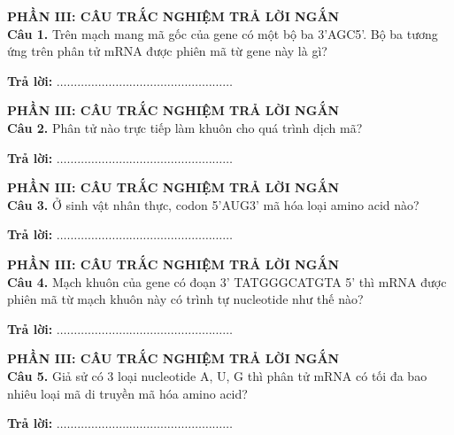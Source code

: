 \documentclass{article}
\begin{document}
\begin{minipage}[t][14.4cm][t]{\linewidth}
\fontsize{28}{38}\selectfont
{\color{brandGreen}\textbf{PHẦN III: CÂU TRẮC NGHIỆM TRẢ LỜI NGẮN}\\[10pt]}
\textbf{Câu 1.} Trên mạch mang mã gốc của gene có một bộ ba 3'AGC5'. Bộ ba tương ứng trên phân tử mRNA được phiên mã từ gene này là gì?
\vspace{20pt}

\textbf{Trả lời:} $\dots\dots\dots\dots\dots\dots\dots\dots\dots\dots\dots\dots\dots\dots\dots\dots\dots$
\vfill
\end{minipage}
\newpage


\begin{minipage}[t][14.4cm][t]{\linewidth}
\fontsize{28}{38}\selectfont
{\color{brandGreen}\textbf{PHẦN III: CÂU TRẮC NGHIỆM TRẢ LỜI NGẮN}\\[10pt]}
\textbf{Câu 2.} Phân tử nào trực tiếp làm khuôn cho quá trình dịch mã?
\vspace{20pt}

\textbf{Trả lời:} $\dots\dots\dots\dots\dots\dots\dots\dots\dots\dots\dots\dots\dots\dots\dots\dots\dots$
\vfill
\end{minipage}
\newpage


\begin{minipage}[t][14.4cm][t]{\linewidth}
\fontsize{28}{38}\selectfont
{\color{brandGreen}\textbf{PHẦN III: CÂU TRẮC NGHIỆM TRẢ LỜI NGẮN}\\[10pt]}
\textbf{Câu 3.} Ở sinh vật nhân thực, codon 5'AUG3' mã hóa loại amino acid nào?
\vspace{20pt}

\textbf{Trả lời:} $\dots\dots\dots\dots\dots\dots\dots\dots\dots\dots\dots\dots\dots\dots\dots\dots\dots$
\vfill
\end{minipage}
\newpage


\begin{minipage}[t][14.4cm][t]{\linewidth}
\fontsize{28}{38}\selectfont
{\color{brandGreen}\textbf{PHẦN III: CÂU TRẮC NGHIỆM TRẢ LỜI NGẮN}\\[10pt]}
\textbf{Câu 4.} Mạch khuôn của gene có đoạn 3' TATGGGCATGTA 5' thì mRNA được phiên mã từ mạch khuôn này có trình tự nucleotide như thế nào?
\vspace{20pt}

\textbf{Trả lời:} $\dots\dots\dots\dots\dots\dots\dots\dots\dots\dots\dots\dots\dots\dots\dots\dots\dots$
\vfill
\end{minipage}
\newpage


\begin{minipage}[t][14.4cm][t]{\linewidth}
\fontsize{28}{38}\selectfont
{\color{brandGreen}\textbf{PHẦN III: CÂU TRẮC NGHIỆM TRẢ LỜI NGẮN}\\[10pt]}
\textbf{Câu 5.} Giả sử có 3 loại nucleotide A, U, G thì phân tử mRNA có tối đa bao nhiêu loại mã di truyền mã hóa amino acid?
\vspace{20pt}

\textbf{Trả lời:} $\dots\dots\dots\dots\dots\dots\dots\dots\dots\dots\dots\dots\dots\dots\dots\dots\dots$
\vfill
\end{minipage}
\newpage
\end{document}
